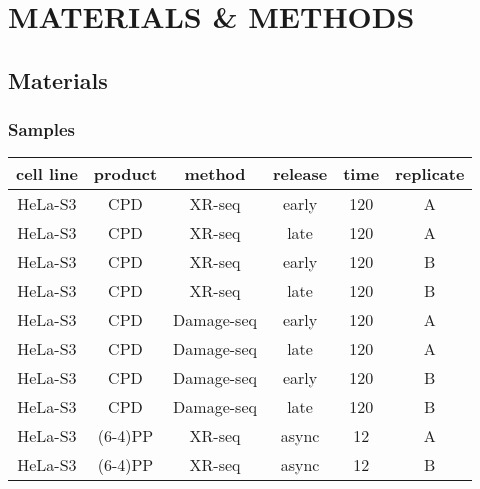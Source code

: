 \setlength{\parindent}{0pt}
\chapter{\bf MATERIALS \& METHODS}

\section{Materials}


\subsection{Samples}
\begin{table}[]
    \begin{tabular}{cccccc}
    \hline
    \multicolumn{1}{|c|}{\textbf{cell line}} & \multicolumn{1}{c|}{\textbf{product}} & \multicolumn{1}{c|}{\textbf{method}} & \multicolumn{1}{c|}{\textbf{release}} & \multicolumn{1}{c|}{\textbf{time}} & \multicolumn{1}{c|}{\textbf{replicate}} \\ \hline
    HeLa-S3           & CPD              & XR-seq         & early            & 120           & A                  \\ \hline 
    HeLa-S3           & CPD              & XR-seq         & late             & 120           & A                  \\ \hline 
    HeLa-S3           & CPD              & XR-seq         & early            & 120           & B                  \\ \hline 
    HeLa-S3           & CPD              & XR-seq         & late             & 120           & B                  \\ \hline 
    HeLa-S3           & CPD              & Damage-seq     & early            & 120           & A                  \\ \hline 
    HeLa-S3           & CPD              & Damage-seq     & late             & 120           & A                  \\ \hline 
    HeLa-S3           & CPD              & Damage-seq     & early            & 120           & B                  \\ \hline 
    HeLa-S3           & CPD              & Damage-seq     & late             & 120           & B                  \\ \hline 
    HeLa-S3           & (6-4)PP           & XR-seq         & async            & 12            & A                  \\ \hline 
    HeLa-S3           & (6-4)PP           & XR-seq         & async            & 12            & B                  \\ \hline 

\end{tabular}
\end{table}
